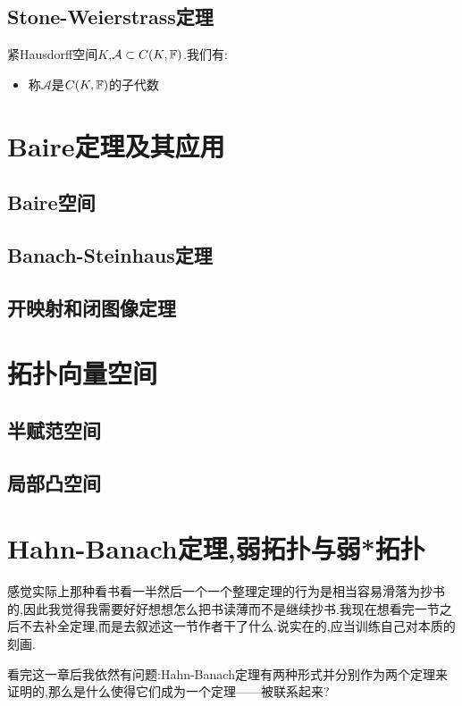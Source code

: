 \documentclass{article}
\begin{document}
\subsection{Stone-Weierstrass定理}
紧Hausdorff空间$K$,$\mathcal{A}\subset C(K,\mathbb{F})$.我们有:
\begin{itemize}
    \item 称$\mathcal{A}$是$C(K,\mathbb{F})$的子代数
\end{itemize}

\section{Baire定理及其应用}

\subsection{Baire空间}

\subsection{Banach-Steinhaus定理}

\subsection{开映射和闭图像定理}

\section{拓扑向量空间}
\subsection{半赋范空间}

\subsection{局部凸空间}

\section{Hahn-Banach定理,弱拓扑与弱*拓扑}

感觉实际上那种看书看一半然后一个一个整理定理的行为是相当容易滑落为抄书的,因此我觉得我需要好好想想怎么把书读薄而不是继续抄书.我现在想看完一节之后不去补全定理,而是去叙述这一节作者干了什么.说实在的,应当训练自己对本质的刻画.

看完这一章后我依然有问题:Hahn-Banach定理有两种形式并分别作为两个定理来证明的,那么是什么使得它们成为一个定理——被联系起来?
\end{document}

